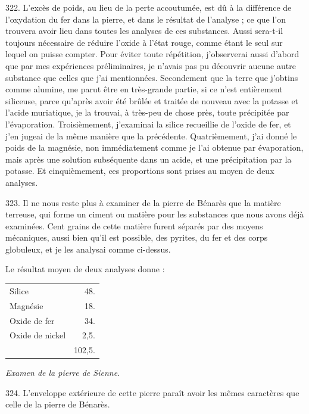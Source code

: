 \documentclass[a4paper, 11pt, oneside, polutonikogreek, french]{article}
\begin{document}
322. L'excès de poids, au lieu de la perte accoutumée, est dû à la différence de l'oxydation du fer dans la pierre, et dans le résultat de l'analyse ; ce que l'on trouvera avoir lieu dans toutes les analyses de ces substances. Aussi sera-t-il toujours nécessaire de réduire l'oxide à l'état rouge, comme étant le seul sur lequel on puisse compter. Pour éviter toute répétition, j'observerai aussi d'abord que par mes expériences préliminaires, je n'avais pas pu découvrir aucune autre substance que celles que j'ai mentionnées. Secondement que la terre que j'obtins comme alumine, me parut être en très-grande partie, si ce n'est entièrement siliceuse, parce qu'après avoir été brûlée et traitée de nouveau avec la potasse et l'acide muriatique, je la trouvai, à très-peu de chose près, toute précipitée par l'évaporation. Troisièmement, j'examinai la silice recueillie de l'oxide de fer, et j'en jugeai de la même manière que la précédente. Quatrièmement, j'ai donné le poids de la magnésie, non immédiatement comme je l'ai obtenue par évaporation, mais après une solution subséquente dans un acide, et une précipitation par la potasse. Et cinquièmement, ces proportions sont prises au moyen de deux analyses.

323. Il ne nous reste plus à examiner de la pierre de Bénarès que la matière terreuse, qui forme un ciment ou matière pour les substances que nous avons déjà examinées. Cent grains de cette matière furent séparés par des moyens mécaniques, aussi bien qu'il est possible, des pyrites, du fer et des corps globuleux, et je les analysai comme ci-dessus.

Le résultat moyen de deux analyses donne :

\begin{table}[!ht]
    \centering
    \bfseries
    \Fontauri
    \Large
    \begin{tabular}{l r}
        Silice & 48. \\
        Magnésie & 18. \\
        Oxide de fer & 34. \\
        Oxide de nickel & 2,5. \\ \hline
        ~ & 102,5. \\
    \end{tabular}
\end{table}

\begin{center}
\emph{Examen de la pierre de Sienne.}
\end{center}

324. L'enveloppe extérieure de cette pierre paraît avoir les mêmes caractères que celle de la pierre de Bénarès.
\end{document}
